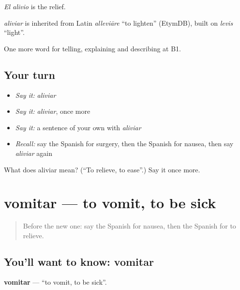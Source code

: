 \emph{El alivio} is the relief.

\begin{cousinweb}
\emph{aliviar} is inherited from Latin \emph{alleviāre} \textquotedblleft{}to lighten\textquotedblright{} (EtymDB), built on \emph{levis} \textquotedblleft{}light\textquotedblright{}.
\end{cousinweb}

\begin{grammarlens}[title={What you've built}]
One more word for telling, explaining and describing at B1.
\end{grammarlens}

\subsection*{Your turn}
\begin{itemize}
\raggedright
  \item \emph{Say it:} \emph{aliviar}
  \item \emph{Say it:} \emph{aliviar}, once more
  \item \emph{Say it:} a sentence of your own with \emph{aliviar}
  \item \emph{Recall:} say the Spanish for surgery, then the Spanish for nausea, then say \emph{aliviar} again
\end{itemize}

\begin{tcolorbox}[breakable,colback=teal!4,colframe=teal!35!black,title={Before you move on}]
What does aliviar mean? (\textquotedblleft{}To relieve, to ease\textquotedblright{}.) Say it once more.
\end{tcolorbox}
\section[vomitar]{vomitar — to vomit, to be sick}

\label{lesson:ES-C740-vomitar}



\begin{quote}
Before the new one: say the Spanish for nausea, then the Spanish for to relieve.
\end{quote}

\subsection*{You'll want to know: vomitar}
\textbf{vomitar} — \textquotedblleft{}to vomit, to be sick\textquotedblright{}.

